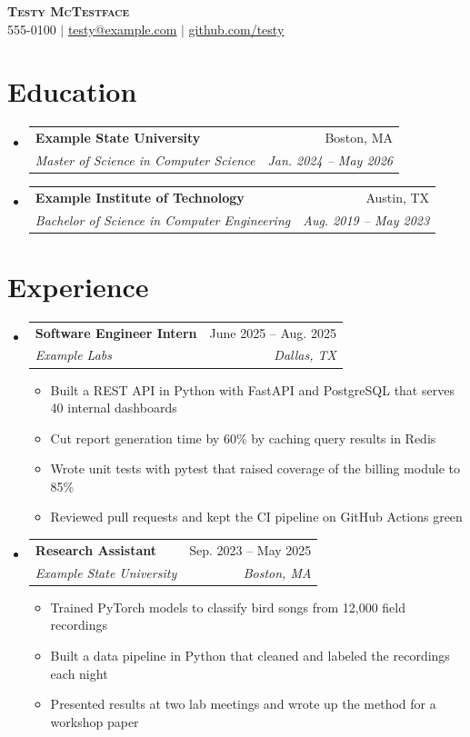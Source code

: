 \documentclass[letterpaper,11pt]{article}
\makeatletter
\newcommand{\resumeItem}[1]{
  \item\small{
    {#1 \vspace{-2pt}}
  }
}
\newcommand{\resumeSubheading}[4]{
  \vspace{-2pt}\item
    \begin{tabular*}{0.97\textwidth}[t]{l@{\extracolsep{\fill}}r}
      \textbf{#1} & #2 \\
      \textit{\small#3} & \textit{\small #4} \\
    \end{tabular*}\vspace{-7pt}
}
\newcommand{\resumeSubHeadingListStart}{\begin{itemize}[leftmargin=0.15in, label={}]}
\newcommand{\resumeSubHeadingListEnd}{\end{itemize}}
\newcommand{\resumeItemListStart}{\begin{itemize}}
\newcommand{\resumeItemListEnd}{\end{itemize}\vspace{-5pt}}
\makeatother
\begin{document}
\begin{center}
    \textbf{\Huge \scshape Testy McTestface} \\ \vspace{1pt}
    \small 555-0100 $|$ \href{mailto:testy@example.com}{\underline{testy@example.com}} $|$
    \href{https://github.com/testy}{\underline{github.com/testy}}
\end{center}


\section{Education}
  \resumeSubHeadingListStart
    \resumeSubheading
      {Example State University}{Boston, MA}
      {Master of Science in Computer Science}{Jan. 2024 -- May 2026}
    \resumeSubheading
      {Example Institute of Technology}{Austin, TX}
      {Bachelor of Science in Computer Engineering}{Aug. 2019 -- May 2023}
  \resumeSubHeadingListEnd


\section{Experience}
  \resumeSubHeadingListStart

    \resumeSubheading
      {Software Engineer Intern}{June 2025 -- Aug. 2025}
      {Example Labs}{Dallas, TX}
      \resumeItemListStart
        \resumeItem{Built a REST API in Python with FastAPI and PostgreSQL that serves 40 internal dashboards}
        \resumeItem{Cut report generation time by 60\% by caching query results in Redis}
        \resumeItem{Wrote unit tests with pytest that raised coverage of the billing module to 85\%}
        \resumeItem{Reviewed pull requests and kept the CI pipeline on GitHub Actions green}
      \resumeItemListEnd

    \resumeSubheading
      {Research Assistant}{Sep. 2023 -- May 2025}
      {Example State University}{Boston, MA}
      \resumeItemListStart
        \resumeItem{Trained PyTorch models to classify bird songs from 12,000 field recordings}
        \resumeItem{Built a data pipeline in Python that cleaned and labeled the recordings each night}
        \resumeItem{Presented results at two lab meetings and wrote up the method for a workshop paper}
      \resumeItemListEnd

  \resumeSubHeadingListEnd


\end{document}
